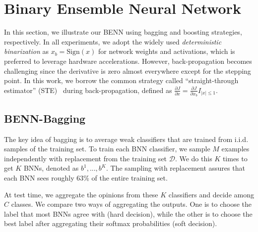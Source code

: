 \documentclass[10pt,twocolumn,letterpaper]{article}
\begin{document}
\section{Binary Ensemble Neural Network}

\label{sec:method}
In this section, we illustrate our BENN using bagging and boosting strategies, respectively. %
In all experiments, we adopt the widely used \emph{deterministic binarization} as $x_{b} = \text{Sign}(x)$ for network weights and activations, which is preferred to leverage hardware accelerations. %
However, back-propagation becomes challenging since the derivative is zero almost everywhere except for the stepping point. In this work, we borrow the common strategy called ``straight-through estimator'' (STE)~\cite{hinton} during back-propagation, defined as $\frac{\partial J}{\partial x} = \frac{\partial J}{\partial x_{b}}I_{|x| \leq 1}$. 

\subsection{BENN-Bagging}

The key idea of bagging is to average weak classifiers that are trained from i.i.d. samples of the training set.
To train each BNN classifier, we sample $M$ examples independently with replacement from the training set $\mathcal{D}$. We do this $K$ times to get $K$ BNNs, denoted as $b^{1}, ..., b^{K}$. The sampling with replacement assures that each BNN sees roughly $63\%$ of the entire training set.

At test time, we aggregate the opinions from these $K$ classifiers and decide among $C$ classes. We compare two ways of aggregating the outputs. One is to choose the label that most BNNs agree with (hard decision), while the other is to choose the best label after aggregating their softmax probabilities (soft decision). %
\end{document}
